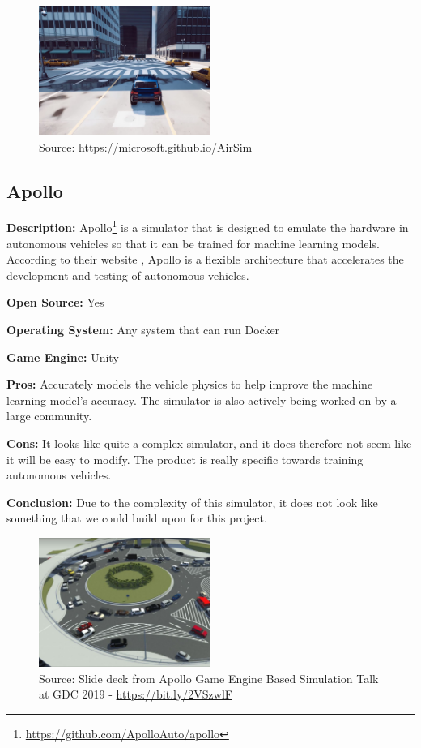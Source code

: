\begin{figure}[H]
    \centering
    \includegraphics[width=0.5\textwidth]{Simulators/AirSim.JPG}
    \caption{Source: \url{https://microsoft.github.io/AirSim}}
\end{figure}

\subsection{Apollo} \label{Apollo}
\textbf{Description:} Apollo\footnote{\url{https://github.com/ApolloAuto/apollo}} is a simulator that is designed to emulate the hardware in autonomous vehicles so that it can be trained for machine learning models. According to their website \cite{Apollo_Website}, Apollo is a flexible architecture that accelerates the development and testing of autonomous vehicles.

\textbf{Open Source:} Yes

\textbf{Operating System:} Any system that can run Docker

\textbf{Game Engine:} Unity

\textbf{Pros:} Accurately models the vehicle physics to help improve the machine learning model's accuracy. The simulator is also actively being worked on by a large community.  

\textbf{Cons:} It looks like quite a complex simulator, and it does therefore not seem like it will be easy to modify. The product is really specific towards training autonomous vehicles. 

\textbf{Conclusion:} Due to the complexity of this simulator, it does not look like something that we could build upon for this project. 

\begin{figure}[H]
    \centering
    \includegraphics[width=0.5\textwidth]{Simulators/Apollo.JPG}
    \caption{Source: Slide deck from Apollo Game Engine Based Simulation Talk at GDC 2019 - \url{https://bit.ly/2VSzwlF}}
\end{figure}

